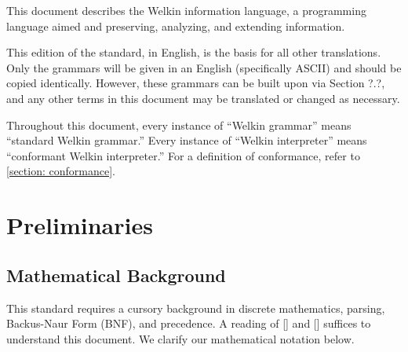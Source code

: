 

This document describes the Welkin information language, a programming language aimed and preserving, analyzing, and extending information.


This edition of the standard, in English, is the basis for all other translations. Only the grammars will be given in an English (specifically ASCII) and should be copied identically. However, these grammars can be built upon via Section ?.?, and any other terms in this document may be translated or changed as necessary.

Throughout this document, every instance of ``Welkin grammar'' means ``standard Welkin grammar.'' Every instance of ``Welkin interpreter'' means ``conformant Welkin interpreter.'' For a definition of conformance, refer to \ref{section: conformance}.

\section{Preliminaries}

\newcommand*{\chars}{\mathrm{CHAR}}
\newcommand*{\numbers}{\mathrm{NUMBERS}}
\newcommand*{\whitespaces}{\mathrm{WHITE\_SPACES}}
\newcommand*{\reserved}{\mathrm{RESERVED}}
\newcommand*{\strings}{\mathrm{STRING}}
\newcommand*{\term}{\mathrm{term}}
\newcommand*{\terms}{\mathrm{terms}}
\newcommand*{\delimiters}{\mathrm{DELIMITERS}}
\newcommand*{\escapes}{\mathrm{STRING\_ESCAPES}}
\newcommand*{\encoding}{\mathcal{E}}
\newcommand*{\decoding}{\mathcal{D}}
\newcommand*{\can}{\textrm{Can}}
\newcommand*{\bnfs}{\mathrm{BNF}}


\newcommand*{\scope}{\textrm{scope}}

\subsection{Mathematical Background}
This standard requires a cursory background in discrete mathematics, parsing, Backus-Naur Form (BNF), and precedence. A reading of [] and [] suffices to understand this document. We clarify our mathematical notation below.


